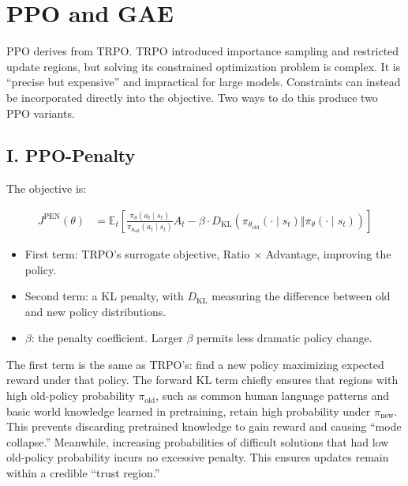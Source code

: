 \setcounter{section}{2}

\hypertarget{ppo-and-gae}{%
\section{PPO and GAE}\label{ppo-and-gae}}

PPO derives from TRPO. TRPO introduced importance sampling and restricted update regions, but solving its constrained optimization problem is complex. It is ``precise but expensive'' and impractical for large models. Constraints can instead be incorporated directly into the objective. Two ways to do this produce two PPO variants.

\hypertarget{i.-ppo-penalty}{%
\subsection{I. PPO-Penalty}\label{i.-ppo-penalty}}

The objective is:

\[
\begin{aligned}
J^{\mathrm{PEN}}(\theta)
&=
\mathbb{E}_t\left[
\frac{\pi_\theta(a_t\mid s_t)}
{\pi_{\theta_{\mathrm{old}}}(a_t\mid s_t)}
A_t
-
\beta\cdot
D_{\mathrm{KL}}\left(
\pi_{\theta_{\mathrm{old}}}(\cdot\mid s_t)
\Vert
\pi_\theta(\cdot\mid s_t)
\right)
\right]
\end{aligned}
\]

\begin{itemize}
\tightlist
\item
  First term: TRPO's surrogate objective, Ratio \(\times\) Advantage, improving the policy.
\item
  Second term: a KL penalty, with \(D_{\mathrm{KL}}\) measuring the difference between old and new policy distributions.
\item
  \(\beta\): the penalty coefficient. Larger \(\beta\) permits less dramatic policy change.
\end{itemize}

The first term is the same as TRPO's: find a new policy maximizing expected reward under that policy. The forward KL term chiefly ensures that regions with high old-policy probability \(\pi_{\mathrm{old}}\), such as common human language patterns and basic world knowledge learned in pretraining, retain high probability under \(\pi_{\mathrm{new}}\). This prevents discarding pretrained knowledge to gain reward and causing ``mode collapse.'' Meanwhile, increasing probabilities of difficult solutions that had low old-policy probability incurs no excessive penalty. This ensures updates remain within a credible ``trust region.''

